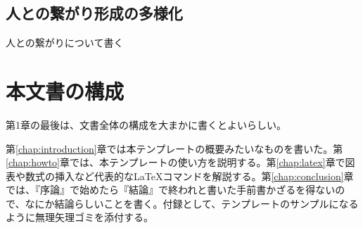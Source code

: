 \subsection{人との繋がり形成の多様化}
人との繋がりについて書く

\section{本文書の構成}

第1章の最後は、文書全体の構成を大まかに書くとよいらしい。

第\ref{chap:introduction}章では本テンプレートの概要みたいなものを書いた。第\ref{chap:howto}章では、本テンプレートの使い方を説明する。第\ref{chap:latex}章で図表や数式の挿入など代表的な\LaTeX コマンドを解説する。第\ref{chap:conclusion}章では、『序論』で始めたら『結論』で終われと書いた手前書かざるを得ないので、なにか結論らしいことを書く。付録として、テンプレートのサンプルになるように無理矢理ゴミを添付する。
